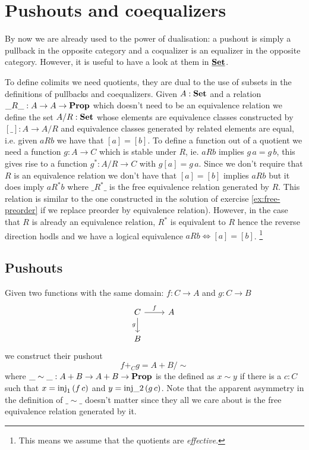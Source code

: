 \section{Pushouts and coequalizers}
\label{sec:push-coeq}

By now we are already used to the power of dualisation: a pushout is simply a pullback in the opposite category and a coqualizer is an equalizer in the opposite category. However, it is useful to have a look at them in $\underline{\mathbf{\mathbf{Set}}}$.

To define colimits we need quotients, they are dual to the use of subsets in the definitions of pullbacks and coequalizers. Given $A:\mathbf{Set}$ and a relation $\_R\_:A \to A \to \mathbf{Prop}$ which doesn't need to be an equivalence relation we define the set $A/R : \mathbf{Set}$ whose elements are equivalence classes constructed by $[\_] : A \to A/R$ and equivalence classes generated by related elements are equal, i.e. given $a R b$ we have that $[a] = [b]$. To define a function out of a quotient we need a function $g : A \to C$ which is stable under $R$, ie. $a R b$ implies $g\,a = g\,b$, this gives rise to a function $g^* : A/R \to C$ with $g [a] = g\, a$. Since we don't require that $R$ is an equivalence relation we don't have that $[a] = [b]$ implies $a R b$ but it does imply $a R^* b$ where $\_R^*\_$ is the free equivalence relation generated by $R$. This relation is similar to the one constructed in the solution of exercise \ref{ex:free-preorder} if we replace preorder by equivalence relation). However, in the case that $R$ is already an equivalence relation, $R^*$ is equivalent to $R$ hence the reverse direction hodls and we have a logical equivalence $ a R b \iff [ a ] = [ b ]$.
\footnote{This means we assume that the quotients are \emph{effective}.}

\subsection{Pushouts}
\label{sec:pushouts}

Given two functions with the same domain: $f : C \to A$ and $g : C \to B$ 
\[\begin{tikzcd}
C \arrow[r,"f"]\arrow[d,"g" left] & A \\
B  
\end{tikzcd}\]
we construct their pushout 
\[ f +_C g = A+B / \sim \]
where $\_\sim\_ : A+B \to A+B \to \mathbf{Prop}$ is the defined as $x \sim y$ if there is a $c:C$ such that $x = \mathrm{inj}_1\,(f\,c)$ and $y = \mathrm{inj}\_2\,(g\,c)$. Note that the apparent asymmetry in the definition of $\_\sim\_$ doesn't matter since they all we care about is the free equivalence relation generated by it.

